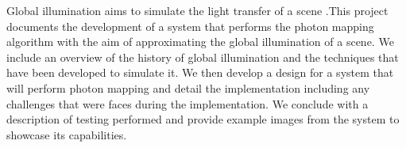 Global illumination aims to simulate the light transfer of a scene .This project documents the development of
a system that performs the photon mapping algorithm with the aim of 
approximating the global illumination of a scene. We include an overview of the history of global illumination
and the techniques that have been developed to simulate it. We then develop a design for a system
that will perform photon mapping and detail the implementation including any challenges that were faces during
the implementation. We conclude with a description of testing performed and provide example images from the
system to showcase its capabilities.
